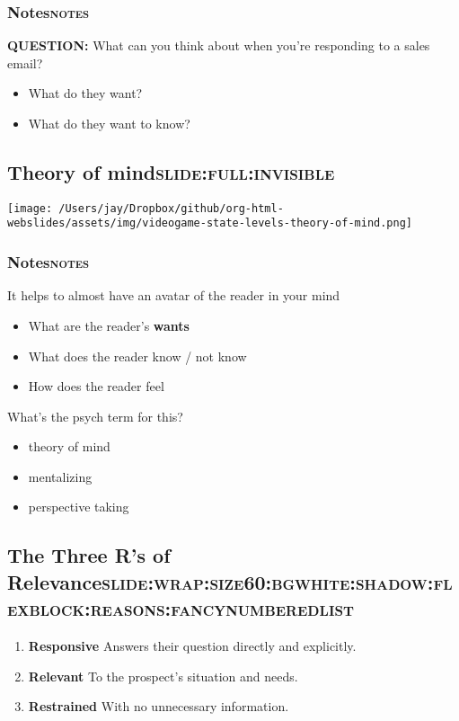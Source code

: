 \documentclass[12pt]{article}
\begin{document}
\subsubsection[Notes]{Notes\hfill{}\textsc{notes}}
\label{sec:orga064139}
\textbf{QUESTION:} What can you think about when you're responding to a sales email?

\begin{itemize}
\item What do they want?
\item What do they want to know?
\end{itemize}

\subsection[Theory of mind]{Theory of mind\hfill{}\textsc{slide:full:invisible}}
\label{sec:orge8352ee}
\begin{center}
\texttt{[image: /Users/jay/Dropbox/github/org-html-webslides/assets/img/videogame-state-levels-theory-of-mind.png]}
\end{center}

\subsubsection[Notes]{Notes\hfill{}\textsc{notes}}
\label{sec:orgef216dd}
It helps to almost have an avatar of the reader in your mind

\begin{itemize}
\item What are the reader's \textbf{wants}
\item What does the reader know / not know
\item How does the reader feel
\end{itemize}

What's the psych term for this?
\begin{itemize}
\item theory of mind
\item mentalizing
\item perspective taking
\end{itemize}

\subsection[The Three R's of Relevance]{The Three R's of Relevance\hfill{}\textsc{slide:wrap:size60:bgwhite:shadow:flexblock:reasons:fancynumberedlist}}
\label{sec:org9b6c0fe}
\begin{enumerate}
\item \textbf{Responsive} Answers their question directly and explicitly.
\item \textbf{Relevant} To the prospect's situation and needs.
\item \textbf{Restrained} With no unnecessary information.
\end{enumerate}
\end{document}

